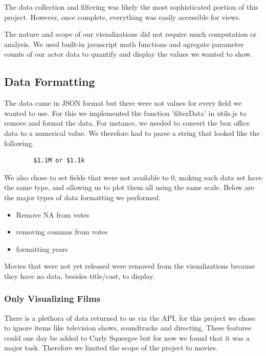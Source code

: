 \documentclass[12pt]{article}
\begin{document}
	The data collection and filtering was likely the most sophisticated portion of this project. However, once complete, everything was easily accessible for views.  
	
	The nature and scope of our visualizations did not require much computation or analysis.  We used built-in javascript math functions and agregate parameter counts of our actor data to quantify and display the values we wanted to show.

\subsection{Data Formatting}

    The data came in JSON format but there were not values for every field we wanted to use. For this we implemented the function 'filterData' in utils.js to remove and format the data. For instance, we needed to convert the box office data to a numerical value. We therefore had to parse a string that looked like the following.
    
    \begin{verbatim}
        $1.1M or $1.1k
    \end{verbatim}

    We also chose to set fields that were not available to 0, making each data set have the same type, and allowing us to plot them all using the same scale. Below are the major types of data formatting we performed.

    \begin{itemize}
        \item Remove NA from votes
        \item removing commas from votes
        \item formatting years
    \end{itemize}


    Movies that were not yet released were removed from the visualizations because they have no data, besides title/cast, to display.


\subsubsection{Only Visualizing Films}

    There is a plethora of data returned to us via the API, for this project we chose to ignore items like television shows, soundtracks and directing. These features could one day be added to Curly Squeegee but for now we found that it was a major task. Therefore we limited the scope of the project to movies.
\end{document}
